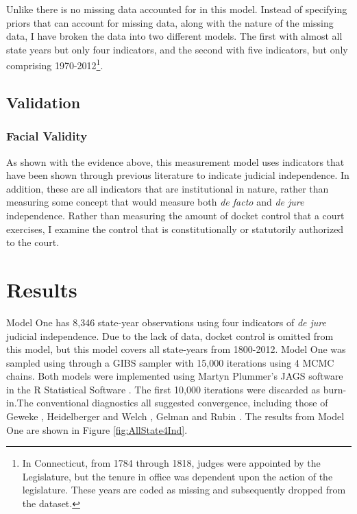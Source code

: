 \documentclass[12pt]{article}
\begin{document}
Unlike \citet{Linzer2014} there is no missing data accounted for in this model.  Instead of specifying priors that can account for missing data, along with the nature of the missing data, I have broken the data into two different models.  The first with almost all state years but only four indicators, and the second with five indicators, but only comprising 1970-2012\footnote{In Connecticut, from 1784 through 1818, judges were appointed by the Legislature, but the tenure in office was dependent upon the action of the legislature.  These years are coded as missing and subsequently dropped from the dataset.}.

\subsection*{Validation}
\subsubsection*{Facial Validity}
As shown with the evidence above, this measurement model uses indicators that have been shown through previous literature to indicate judicial independence.  In addition, these are all indicators that are institutional in nature, rather than measuring some concept that would measure both \textit{de facto} and \textit{de jure} independence.  Rather than measuring the amount of docket control that a court exercises, I examine the control that is constitutionally or statutorily authorized to the court.  

\section*{Results}
Model One has 8,346 state-year observations using four indicators of \textit{de jure} judicial independence.  Due to the lack of data, docket control is omitted from this model, but this model covers all state-years from 1800-2012.  Model One was sampled using through a GIBS sampler with 15,000 iterations using 4 MCMC chains.  Both models were implemented using Martyn Plummer’s JAGS software \citep{Plummer2014} in the R Statistical Software \citep{R-Core-Team2014}.  The first 10,000 iterations were discarded as burn-in.The conventional diagnostics all suggested convergence, including those of Geweke \citet{Geweke1991}, Heidelberger and Welch \citet{Heidelberger1981,Heidelberger1983}, Gelman and Rubin \citet{Gelman1992}.  The results from Model One are shown in Figure \ref{fig:AllState4Ind}.
\end{document}
